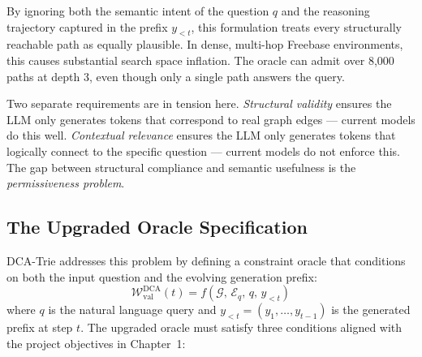 By ignoring both the semantic intent of the question $q$ and the reasoning trajectory captured in the prefix $y_{<t}$, this formulation treats every structurally reachable path as equally plausible. In dense, multi-hop Freebase environments, this causes substantial search space inflation. The oracle can admit over 8,000 paths at depth 3, even though only a single path answers the query.

Two separate requirements are in tension here. \textit{Structural validity} ensures the LLM only generates tokens that correspond to real graph edges — current models do this well. \textit{Contextual relevance} ensures the LLM only generates tokens that logically connect to the specific question — current models do not enforce this. The gap between structural compliance and semantic usefulness is the \textit{permissiveness problem}.

\subsection{The Upgraded Oracle Specification}

DCA-Trie addresses this problem by defining a constraint oracle that conditions on both the input question and the evolving generation prefix:
\begin{equation}
  \mathcal{W}_{\text{val}}^{\text{DCA}}(t) = f(\mathcal{G},\, \mathcal{E}_q,\,
  q,\, y_{<t})
  \label{eq:dca_oracle}
\end{equation}
where $q$ is the natural language query and $y_{<t} = (y_1, \ldots, y_{t-1})$ is the generated prefix at step $t$. The upgraded oracle must satisfy three conditions aligned with the project objectives in Chapter~1:

